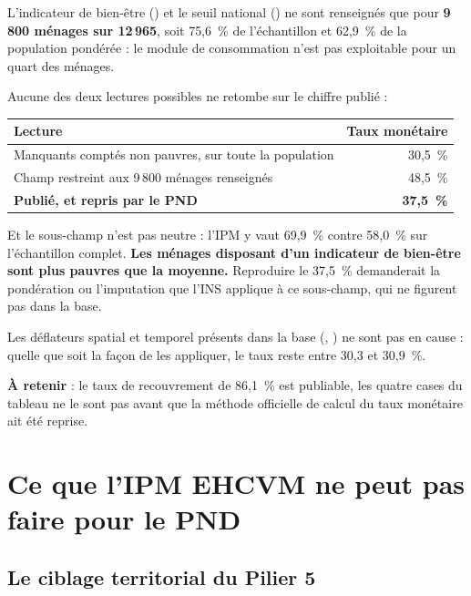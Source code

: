 \documentclass[11pt,a4paper]{article}
\begin{document}
\begin{attention}
L'indicateur de bien-être () et le seuil national () ne sont renseignés que
pour \textbf{9\,800 ménages sur 12\,965}, soit 75,6~\% de l'échantillon et 62,9~\% de la population
pondérée : le module de consommation n'est pas exploitable pour un quart des ménages.

Aucune des deux lectures possibles ne retombe sur le chiffre publié :

\begin{center}
\begin{tabular}{@{}lr@{}}
\toprule
\textbf{Lecture} & \textbf{Taux monétaire} \\
\midrule
Manquants comptés non pauvres, sur toute la population & 30,5~\% \\
Champ restreint aux 9\,800 ménages renseignés & 48,5~\% \\
\textbf{Publié, et repris par le PND} & \textbf{37,5~\%} \\
\bottomrule
\end{tabular}
\end{center}

Et le sous-champ n'est pas neutre : l'IPM y vaut 69,9~\% contre 58,0~\% sur l'échantillon complet.
\textbf{Les ménages disposant d'un indicateur de bien-être sont plus pauvres que la moyenne.}
Reproduire le 37,5~\% demanderait la pondération ou l'imputation que l'INS applique à ce
sous-champ, qui ne figurent pas dans la base.

Les déflateurs spatial et temporel présents dans la base (, ) ne sont
pas en cause : quelle que soit la façon de les appliquer, le taux reste entre 30,3 et 30,9~\%.

\textbf{À retenir} : le taux de recouvrement de 86,1~\% est publiable, les quatre cases du tableau
ne le sont pas avant que la méthode officielle de calcul du taux monétaire ait été reprise.
\end{attention}

\section{Ce que l'IPM EHCVM ne peut pas faire pour le PND}

\subsection{Le ciblage territorial du Pilier 5}
\end{document}
